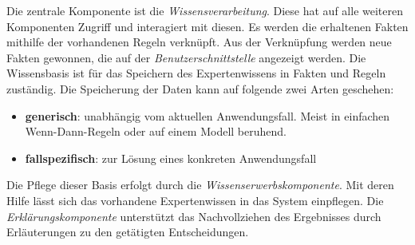 Die zentrale Komponente ist die \textit{Wissensverarbeitung}. Diese hat auf alle weiteren Komponenten Zugriff und interagiert mit diesen. Es werden die erhaltenen Fakten mithilfe der vorhandenen Regeln verknüpft. Aus der Verknüpfung werden neue Fakten gewonnen, die auf der \textit{Benutzerschnittstelle} angezeigt werden. Die Wissensbasis ist für das Speichern des Expertenwissens in Fakten und Regeln zuständig. Die Speicherung der Daten kann auf folgende zwei Arten geschehen\cite{bib:expert1}:\par
\begin{itemize}
        \item \textbf{generisch}: unabhängig vom aktuellen Anwendungsfall. Meist in einfachen Wenn-Dann-Regeln oder auf einem Modell beruhend. 
        \item \textbf{fallspezifisch}: zur Lösung eines konkreten Anwendungsfall
\end{itemize}
 Die Pflege dieser Basis erfolgt durch die \textit{Wissenserwerbskomponente}. Mit deren Hilfe lässt sich das vorhandene Expertenwissen in das System einpflegen. Die \textit{Erklärungskomponente} unterstützt das Nachvollziehen des Ergebnisses durch Erläuterungen zu den getätigten Entscheidungen.

